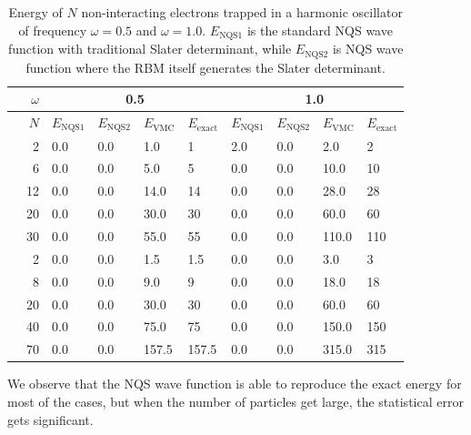 \begin{table} [H]
	\caption{Energy of $N$ non-interacting electrons trapped in a harmonic oscillator of frequency $\omega=0.5$ and $\omega=1.0$. $E_{\text{NQS1}}$ is the standard NQS wave function with traditional Slater determinant, while $E_{\text{NQS2}}$ is NQS wave function where the RBM itself generates the Slater determinant. }
	\label{tab:quantumdotswointeraction}
	\begin{tabularx}{\textwidth}{r|r|XXXX:XXXX} \hline\hline
		\label{tab:nn}
		& $\omega$ & &\\ \hline
		& $N$ & $E_{\text{NQS1}}$ & $E_{\text{NQS2}}$ & $E_{\text{VMC}}$ & $E_{\text{exact}}$ & $E_{\text{NQS1}}$ & $E_{\text{NQS2}}$ & $E_{\text{VMC}}$ & $E_{\text{exact}}$ \\ \hline
		
		\parbox[t]{2mm}{}
		&2 & 0.0 & 0.0 & 1.0 & 1 & 2.0 & 0.0 & 2.0 & 2\\
		&6 & 0.0 & 0.0 & 5.0 & 5 & 0.0 & 0.0 & 10.0 & 10 \\
		&12 & 0.0 & 0.0 & 14.0 & 14 & 0.0 & 0.0 & 28.0 & 28\\
		&20 & 0.0 & 0.0 & 30.0 & 30 & 0.0 & 0.0 & 60.0 & 60\\
		&30 & 0.0 & 0.0 & 55.0 & 55 & 0.0 & 0.0 & 110.0 & 110\\ \hline
		
		\parbox[t]{2mm}{}
		&2 & 0.0 & 0.0 & 1.5 & 1.5 & 0.0 & 0.0 & 3.0 & 3 \\
		&8 & 0.0 & 0.0 & 9.0 & 9 & 0.0 & 0.0 & 18.0 & 18 \\
		&20 & 0.0 & 0.0 & 30.0 & 30 & 0.0 & 0.0 & 60.0 & 60 \\
		&40 & 0.0 & 0.0 & 75.0 & 75 & 0.0 & 0.0 & 150.0 & 150 \\
		&70 & 0.0 & 0.0 & 157.5 & 157.5 & 0.0 & 0.0 & 315.0 & 315 \\ \hline\hline
	\end{tabularx}
\end{table}
We observe that the NQS wave function is able to reproduce the exact energy for most of the cases, but when the number of particles get large, the statistical error gets significant.

